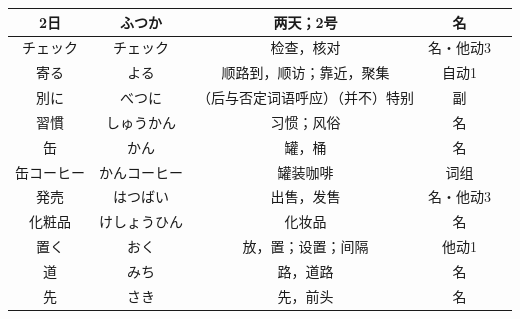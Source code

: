 \begin{longtable}{|c|c|c|c|c|}
2日 & ふつか & 两天；2号 & 名 &  \\ \hline
チェック & チェック & 检查，核对 & 名・他动3 &  \\ \hline
寄る & よる & 顺路到，顺访；靠近，聚集 & 自动1 &  \\ \hline
別に & べつに & （后与否定词语呼应）（并不）特别 & 副 &  \\ \hline
習慣 & しゅうかん & 习惯；风俗 & 名 &  \\ \hline
缶 & かん & 罐，桶 & 名 &  \\ \hline
缶コーヒー & かんコーヒー & 罐装咖啡 & 词组 &  \\ \hline
発売 & はつばい & 出售，发售 & 名・他动3 &  \\ \hline
化粧品 & けしょうひん & 化妆品 & 名 &  \\ \hline
置く & おく & 放，置；设置；间隔 & 他动1 &  \\ \hline
道 & みち & 路，道路 & 名 &  \\ \hline
先 & さき & 先，前头 & 名 &  \\ \hline
\end{longtable}

